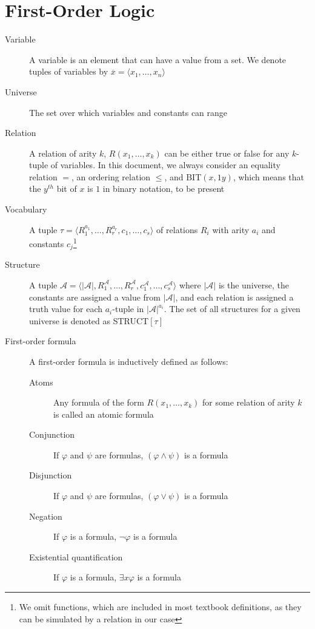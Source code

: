 \section{First-Order Logic}\label{sec:first-order-logic}
\begin{description}
    \item[Variable] A variable is an element that can have a value from a set.
    We denote tuples of variables by $\overline{x} = \langle x_1, \dots, x_n \rangle$
    \item[Universe] The set over which variables and constants can range
    \item[Relation] A relation of arity $k$, $R(x_1, \dots, x_k)$ can be either true or false for any $k$-tuple of variables.
    In this document, we always consider an equality relation $=$, an ordering relation $\leq$, and \acs{BIT}$(x, 1y)$, which means that the $y^{th}$ bit of $x$ is $1$ in binary notation, to be present
    \item[Vocabulary] A tuple $\tau = \langle R_1^{a_1}, \dots, R_r^{a_r}, c_1, \dots, c_s \rangle$ of relations $R_i$ with arity $a_i$ and constants $c_j$\footnote{We omit functions, which are included in most textbook definitions, as they can be simulated by a relation in our case}
    \item[Structure] A tuple $\mathcal{A} = \langle |\mathcal{A}|, R_1^{\mathcal{A}}, \dots, R_r^{\mathcal{A}}, c_1^{\mathcal{A}}, \dots, c_s^{\mathcal{A}} \rangle$ where $|\mathcal{A}|$ is the universe, the constants are assigned a value from $|\mathcal{A}|$, and each relation is assigned a truth value for each $a_i$-tuple in $|\mathcal{A}|^{a_i}$.
    The set of all structures for a given universe is denoted as \acs{STRUCT}$[\tau]$
    \item[First-order formula] A first-order formula is inductively defined as follows:
    \begin{description}
        \item[Atoms] Any formula of the form $R(x_1, \dots, x_k)$ for some relation of arity $k$ is called an atomic formula
        \item[Conjunction] If $\varphi$ and $\psi$ are formulas, $(\varphi \land \psi)$ is a formula
        \item[Disjunction] If $\varphi$ and $\psi$ are formulas, $(\varphi \lor \psi)$ is a formula
        \item[Negation] If $\varphi$ is a formula, $\lnot \varphi$ is a formula
        \item[Existential quantification] If $\varphi$ is a formula, $\exists x \varphi$ is a formula

\end{description}
\end{description}
